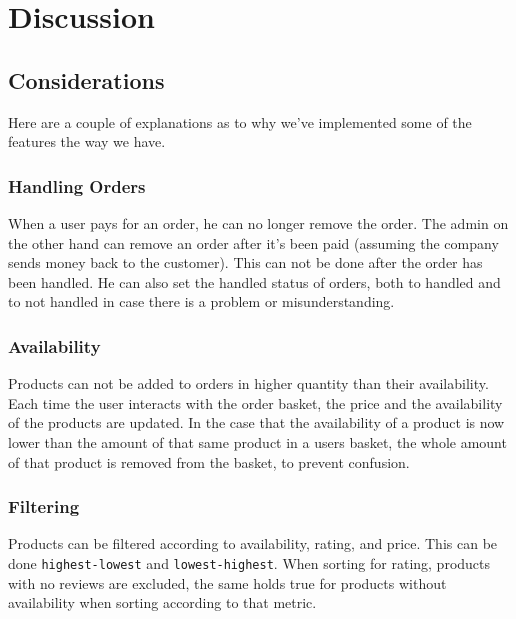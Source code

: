 \newpage
\section{Discussion}\label{sec:discussion}

\subsection{Considerations}

Here are a couple of explanations as to why we've implemented some of the
features the way we have.

\subsubsection{Handling Orders}

When a user pays for an order, he can no longer remove the order. The admin
on the other hand can remove an order after it's been paid (assuming the
company sends money back to the customer). This can not be done after the
order has been handled. He can also set the handled status of orders, both
to handled and to not handled in case there is a problem or misunderstanding.

\subsubsection{Availability}

Products can not be added to orders in higher quantity than their availability.
Each time the user interacts with the order basket, the price and the
availability of the products are updated. In the case that the availability
of a product is now lower than the amount of that same product in a users
basket, the whole amount of that product is removed from the basket, to
prevent confusion.

\subsubsection{Filtering}

Products can be filtered according to availability, rating,
and price. This can be done \texttt{highest-lowest} and
\texttt{lowest-highest}. When sorting for rating, products with no
reviews are excluded, the same holds true for products without availability
when sorting according to that metric.
